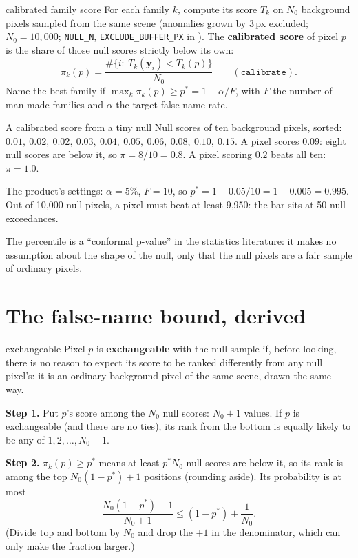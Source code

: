 \documentclass[11pt,a4paper,oneside,openany]{book}
\newcommand{\B}[1]{{\symbf{#1}}}
\newcommand{\B}[1]{{\bm{#1}}}
\newcommand{\vy}{\B{y}}
\begin{document}
\begin{defn}{calibrated family score}
For each family $k$, compute its score $T_k$ on $N_0$ background pixels sampled from the same scene (anomalies grown by 3\,px excluded; $N_0=10{,}000$;
\texttt{NULL\_N}, \texttt{EXCLUDE\_BUFFER\_PX} in ). The \textbf{calibrated score} of pixel $p$ is the share of those null scores strictly below its own:
\[
  \pi_k(p)=\frac{\#\{i:\ T_k(\vy_i)<T_k(p)\}}{N_0}\qquad(\texttt{calibrate}).
\]
Name the best family if $\max_k\pi_k(p)\ge p^\ast=1-\alpha/F$, with $F$ the number of man-made families and $\alpha$ the target false-name rate.
\end{defn}

\begin{worked}[label=we:calib]{A calibrated score from a tiny null}
Null scores of ten background pixels, sorted: $0.01,\ 0.02,\ 0.02,\ 0.03,\ 0.04,\ 0.05,\ 0.06,\ 0.08,\ 0.10,\ 0.15$. A pixel scores $0.09$: eight null scores are below it, so
$\pi=8/10=0.8$. A pixel scoring $0.2$ beats all ten: $\pi=1.0$.

The product's settings: $\alpha=5\%$, $F=10$, so $p^\ast=1-0.05/10=1-0.005=0.995$. Out of 10{,}000 null pixels, a pixel must beat at least 9{,}950: the bar sits at 50 null
exceedances.
\end{worked}

The percentile is a ``conformal p-value'' in the statistics literature: it makes no assumption about the shape of the null, only that the null pixels are a fair
sample of ordinary pixels.

\section{The false-name bound, derived}

\begin{defn}{exchangeable}
Pixel $p$ is \textbf{exchangeable} with the null sample if, before looking, there is no reason to expect its score to be ranked differently from any null pixel's: it
is an ordinary background pixel of the same scene, drawn the same way.
\end{defn}

\textbf{Step 1.} Put $p$'s score among the $N_0$ null scores: $N_0+1$ values. If $p$ is exchangeable (and there are no ties), its rank from the bottom is equally
likely to be any of $1,2,\dots,N_0+1$.

\textbf{Step 2.} $\pi_k(p)\ge p^\ast$ means at least $p^\ast N_0$ null scores are below it, so its rank is among the top $N_0(1-p^\ast)+1$ positions (rounding aside).
Its probability is at most
\[
  \frac{N_0(1-p^\ast)+1}{N_0+1}\le(1-p^\ast)+\frac1{N_0}.
\]
(Divide top and bottom by $N_0$ and drop the $+1$ in the denominator, which can only make the fraction larger.)
\end{document}
